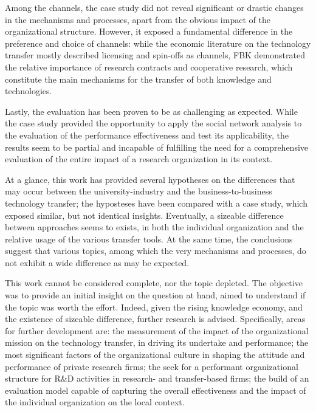 Among the channels, the case study did not reveal significant or drastic changes in the mechanisms and processes, apart from the obvious impact of the organizational structure. However, it exposed a fundamental difference in the preference and choice of channels: while the economic literature on the technology transfer mostly described licensing and spin-offs as channels, FBK demonstrated the relative importance of research contracts and cooperative research, which constitute the main mechanisms for the transfer of both knowledge and technologies.

Lastly, the evaluation has been proven to be as challenging as expected. While the case study provided the opportunity to apply the social network analysis to the evaluation of the performance effectiveness and test its applicability, the results seem to be partial and incapable of fulfilling the need for a comprehensive evaluation of the entire impact of a research organization in its context. 

At a glance, this work has provided several hypotheses on the differences that may occur between the university-industry and the business-to-business technology transfer; the hyposteses have been compared with a case study, which exposed similar, but not identical insights. Eventually, a sizeable difference between approaches seems to exists, in both the individual organization and the relative usage of the various transfer tools. At the same time, the conclusions suggest that various topics, among which the very mechanisms and processes, do not exhibit a wide difference as may be expected. 

This work cannot be considered complete, nor the topic depleted. The objective was to provide an initial insight on the question at hand, aimed to understand if the topic was worth the effort. Indeed, given the rising knowledge economy, and the existence of sizeable difference, further research is advised. Specifically, areas for further development are: the measurement of the impact of the organizational mission on the technology transfer, in driving its undertake and performance; the most significant factors of the organizational culture in shaping the attitude and performance of private research firms; the seek for a performant organizational structure for R\&D activities in research- and transfer-based firms; the build of an evaluation model capable of capturing the overall effectiveness and the impact of the individual organization on the local context. 
